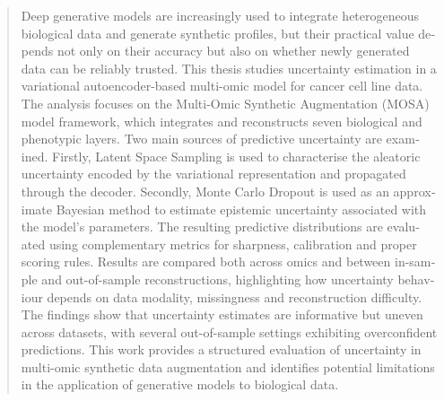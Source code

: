 
\begin{otherlanguage}{english}
\begin{abstract}
\thispagestyle{plain}
\abstractEnglishPageNumber

Deep generative models are increasingly used to integrate heterogeneous biological data and generate synthetic profiles, but their practical value depends not only on their accuracy but also on whether newly generated data can be reliably trusted. This thesis studies uncertainty estimation in a variational autoencoder-based multi-omic model for cancer cell line data. The analysis focuses on the Multi-Omic Synthetic Augmentation (MOSA) model framework, which integrates and reconstructs seven biological and phenotypic layers. Two main sources of predictive uncertainty are examined. Firstly, Latent Space Sampling is used to characterise the aleatoric uncertainty encoded by the variational representation and propagated through the decoder. Secondly, Monte Carlo Dropout is used as an approximate Bayesian method to estimate epistemic uncertainty associated with the model's parameters. The resulting predictive distributions are evaluated using complementary metrics for sharpness, calibration and proper scoring rules. Results are compared both across omics and between in-sample and out-of-sample reconstructions, highlighting how uncertainty behaviour depends on data modality, missingness and reconstruction difficulty. The findings show that uncertainty estimates are informative but uneven across datasets, with several out-of-sample settings exhibiting overconfident predictions. This work provides a structured evaluation of uncertainty in multi-omic synthetic data augmentation and identifies potential limitations in the application of generative models to biological data.

\begin{flushleft}


\end{flushleft}

\end{abstract}
\end{otherlanguage}